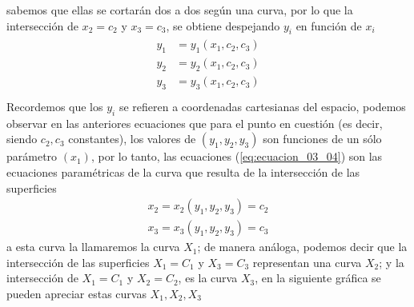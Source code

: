sabemos que ellas se cortarán dos a dos según una curva, por lo que la intersección de $x_{2} = c_{2}$ y $x_{3} = c_{3}$, se obtiene despejando $y_{i}$ en función de $x_{i}$
\begin{align}
\begin{aligned}
y_{1} &= y_{1} (x_{1}, c_{2}, c_{3}) \\
y_{2} &= y_{2} (x_{1}, c_{2}, c_{3}) \\
y_{3} &= y_{3} (x_{1}, c_{2}, c_{3}) \\
\end{aligned}
\label{eq:ecuacion_03_04}
\end{align}
Recordemos que los $y_{i}$ se refieren a coordenadas cartesianas del espacio, podemos observar en las anteriores ecuaciones que para el punto en cuestión (es decir, siendo $c_{2}, c_{3}$ constantes), los valores de $(y_{1}, y_{2}, y_{3})$ son funciones de un sólo parámetro $(x_{1})$, por lo tanto, las ecuaciones (\ref{eq:ecuacion_03_04}) son las ecuaciones paramétricas de la curva que resulta de la intersección de las superficies
\begin{align*}
x_{2} = x_{2} (y_{1}, y_{2}, y_{3}) = c_{2} \\
x_{3} = x_{3} (y_{1}, y_{2}, y_{3}) = c_{3}
\end{align*}
a esta curva la llamaremos la curva $X_{1}$; de manera análoga, podemos decir que la intersección de las superficies $X_{1} = C_{1}$ y $X_{3} = C_{3}$ representan una curva $X_{2}$; y la intersección de $X_{1} = C_{1}$ y $X_{2} = C_{2}$, es la curva $X_{3}$, en la siguiente gráfica se pueden apreciar estas curvas $X_{1}, X_{2}, X_{3}$

